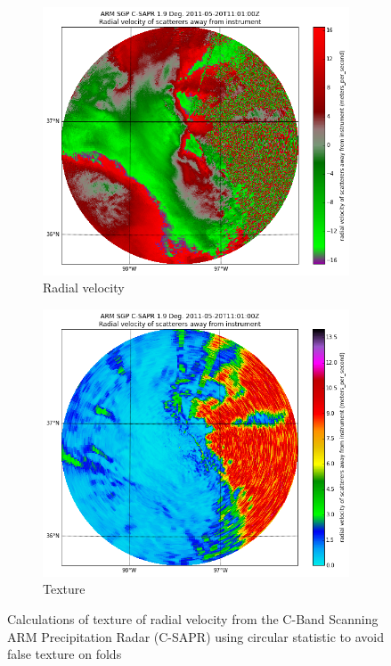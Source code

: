 \documentclass[twocol]{ametsoc}
\begin{document}
\begin{figure}[h]
    \centering
    \begin{subfigure}[b]{0.4\columnwidth}
        \includegraphics[width=\columnwidth]{radial_velocity.png}
        \caption{Radial velocity}
        \label{fig:textcalc:vr}
    \end{subfigure}
    \begin{subfigure}[b]{0.4\columnwidth}
        \includegraphics[width=\columnwidth]{texture.png}
        \caption{Texture}
        \label{fig:textcalc:vr}
    \end{subfigure}
    \caption{Calculations of texture of radial velocity from the C-Band Scanning ARM Precipitation Radar (C-SAPR) using circular statistic to avoid false texture on folds}\label{fig:textcalc}
\end{figure}
\end{document}
